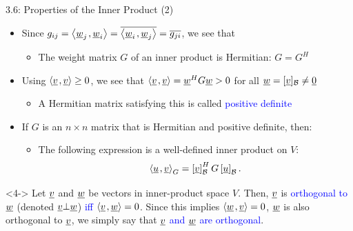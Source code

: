 \documentclass[10pt,english,aspectratio=169]{beamer}
\begin{document}
\begin{frame}{3.6: Properties of the Inner Product (2)}

\begin{itemize}
\item<1-> Since $g_{ij} = {\left\langle  \underline{w}_j  \mskip2mu ,  \underline{w}_i  \right\rangle} = \overline{{\left\langle  \underline{w}_i  \mskip2mu ,  \underline{w}_j  \right\rangle}} = \overline{g_{ji}}$, we see that
\begin{itemize}
\item The weight matrix $G$ of an inner product is Hermitian: $G = G^H$
\end{itemize}

\vspace{1mm}
\item<2-> Using ${\left\langle  \underline{v}  \mskip2mu ,  \underline{v}  \right\rangle} \geq 0$, we see that ${\left\langle  \underline{v}  \mskip2mu ,  \underline{v}  \right\rangle} = \underline{w}^H G \underline{w} > 0$ for all $\underline{w} = [\underline{v}]_{\mathcal{B}} \neq \underline{0}$ \vspace{0.5mm}
\begin{itemize}
\item A Hermitian matrix satisfying this is called  \textcolor{blue}{positive definite} 

\end{itemize}

\vspace{1mm}
\item<3-> If $G$ is an $n \times n$ matrix that is Hermitian and positive definite, then:
\begin{itemize}
\item The following expression is a well-defined inner product on $V$:
\begin{equation*}
{\left\langle  \underline{u}  \mskip2mu ,  \underline{v}  \right\rangle}_G
= \left[ \underline{v} \right]_{\mathcal{B}}^H G \left[ \underline{u} \right]_{\mathcal{B}}.
\end{equation*}
\end{itemize}

\end{itemize}

\begin{definition}[Orthogonal]<4->
Let $\underline{v}$ and $\underline{w}$ be vectors in inner-product space $V$.
Then, $\underline{v}$ is \textcolor{blue}{orthogonal to $\underline{w}$} (denoted $\underline{v} \bot \underline{w}$) \textcolor{blue}{iff ${\left\langle  \underline{v}  \mskip2mu ,  \underline{w}  \right\rangle} = 0$}.
Since this implies ${\left\langle  \underline{w}  \mskip2mu ,  \underline{v}  \right\rangle} = 0$, $\underline{w}$ is also orthogonal to $\underline{v}$, we simply say that \textcolor{blue}{$\underline{v}$ and $\underline{w}$ are orthogonal}.
\end{definition}

\end{frame}
\end{document}
